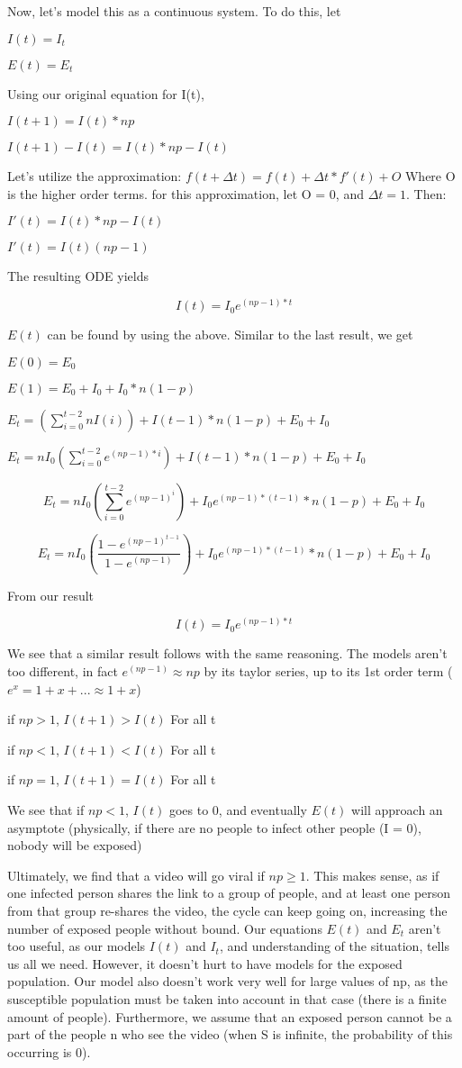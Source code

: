 \documentclass{article}
\begin{document}
Now, let's model this as a continuous system. To do this, let 

$I(t)=I_t$

$E(t)=E_t$

Using our original equation for I(t),

$I(t+1)=I(t)*np$

$I(t+1)-I(t)=I(t)*np-I(t)$

Let's utilize the approximation: $f(t+\Delta t)=f(t)+\Delta t *f'(t)+O$ Where O is the higher order terms. for this approximation, let O = 0, and $\Delta t = 1$. Then:

$I'(t)=I(t)*np-I(t)$

$I'(t)=I(t)(np-1)$

The resulting ODE yields

$$I(t) = I_0e^{(np-1)*t}$$

$E(t)$ can be found by using the above. Similar to the last result, we get 

$E(0) = E_0$

$E(1) = E_0 + I_0 + I_0*n(1-p)$

$E_t=(\sum_{i=0}^{t-2}nI(i))+I(t-1)*n(1-p)+E_0+I_0$

$E_t=nI_0(\sum_{i=0}^{t-2}e^{(np-1)*i})+I(t-1)*n(1-p)+E_0+I_0$

$$E_t=nI_0(\sum_{i=0}^{t-2}e^{(np-1)^i})+I_0e^{(np-1)*(t-1)}*n(1-p)+E_0+I_0$$

$$E_t=nI_0(\frac{1-e^{(np-1)^{t-1}}}{1-e^{(np-1)}})+I_0e^{(np-1)*(t-1)}*n(1-p)+E_0+I_0$$

From our result 

$$I(t) = I_0e^{(np-1)*t}$$

We see that a similar result follows with the same reasoning. The models aren't too different, in fact $e^{(np-1)} \approx np$ by its taylor series, up to its 1st order term ($e^x = 1 + x + ... \approx 1 + x$)

if $np > 1$, $I(t+1) > I(t)$ For all t

if $np < 1$, $I(t+1) < I(t)$ For all t

if $np = 1$, $I(t+1) = I(t)$ For all t

We see that if $np < 1$, $I(t)$ goes to 0, and eventually $E(t)$ will approach an asymptote (physically, if there are no people to infect other people (I = 0), nobody will be exposed)

Ultimately, we find that a video will go viral if $ np \ge 1$. This makes sense, as if one infected person shares the link to a group of people, and at least one person from that group re-shares the video, the cycle can keep going on, increasing the number of exposed people without bound. Our equations $E(t)$ and $E_t$ aren't too useful, as our models $I(t)$ and $I_t$, and understanding of the situation, tells us all we need. However, it doesn't hurt to have models for the exposed population. Our model also doesn't work very well for large values of np, as the susceptible population must be taken into account in that case (there is a finite amount of people). Furthermore, we assume that an exposed person cannot be a part of the people n who see the video (when S is infinite, the probability of this occurring is 0).
\end{document}
